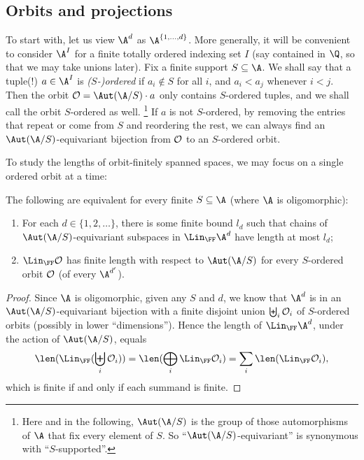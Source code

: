 \subsection{Orbits and projections}
To start with, let us view $\A^d$ as $\A^{\{1, \dots, d\}}$. More generally, it will be convenient to consider $\A^I$ for a finite totally ordered indexing set $I$ (say contained in $\Q$, so that we may take unions later).
Fix a finite support $S \subseteq \A$.
We shall say that a tuple(!) $a\in\A^I$ is {\em ($S$-)ordered} if $a_i \not\in S$ for all $i$, and $a_i < a_j$ whenever $i < j$. Then the orbit
$\cal O = \Aut(\A/S) \cdot a$ only contains $S$-ordered tuples, and we shall call the orbit $S$-ordered as well.%
\footnote{Here and in the following, $\Aut(\A/S)$ is the group of those automorphisms of $\A$ that fix every element of $S$. So ``$\Aut(\A/S)$-equivariant'' is synonymous with ``$S$-supported''.}
If $a$ is not $S$-ordered, by removing the entries that repeat or come from $S$ and reordering the rest, we can always find an $\Aut(\A/S)$-equivariant bijection from $\cal O$ to an $S$-ordered orbit.

To study the lengths of orbit-finitely spanned spaces, we may focus on a single ordered orbit at a time:
\begin{claim}\label{claim:reduction-to-one-orbit}
    \color{magenta}
    The following are equivalent for every finite $S \subseteq \A$ (where $\A$ is oligomorphic):
    \begin{enumerate}
        \item For each $d \in \{1, 2, \dots\}$, there is some finite bound $l_d$ such that chains of $\Aut(\A/S)$-equivariant subspaces in $\Lin_\FF \A^d$ have length at most $l_d$;
        \item $\Lin_\FF \cal O$ has finite length with respect to $\Aut(\A/S)$ for every $S$-ordered orbit $\cal O$ (of every $\A^{d'}$).
    \end{enumerate}
\end{claim}
\begin{proof}
    \color{magenta}
    Since $\A$ is oligomorphic, given any $S$ and $d$, 
    we know that $\A^d$ is in an $\Aut(\A/S)$-equivariant bijection with a finite disjoint union $\biguplus_i \cal O_i$ of $S$-ordered orbits (possibly in lower ``dimensions'').
    Hence the length of $\Lin_\FF \A^d$, under the action of $\Aut(\A/S)$, equals \[
        \len(\Lin_\FF(\biguplus_i \cal O_i)) = \len(\bigoplus_i \Lin_\FF \cal O_i) = \sum_i \len(\Lin_\FF \cal O_i),
    \]
    which is finite if and only if each summand is finite.
\end{proof}

